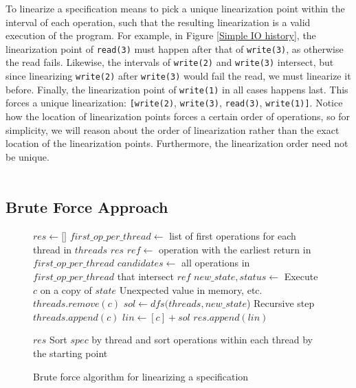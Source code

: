\documentclass[oneside, a4paper, onecolumn, 10pt]{article}
\begin{document}
To linearize a specification means to pick a unique linearization point within the interval of each operation, such that the resulting linearization is a valid execution of the program. For example, in Figure \ref{Simple IO history}, the linearization point of \verb|read(3)| must happen after that of \verb|write(3)|, as otherwise the read fails. Likewise, the intervals of \verb|write(2)| and \verb|write(3)| intersect, but since linearizing \verb|write(2)| after \verb|write(3)| would fail the read, we must linearize it before. Finally, the linearization point of \verb|write(1)| in all cases happens last. This forces a unique linearization: \verb|[write(2)|, \verb|write(3)|, \verb|read(3)|, \verb|write(1)]|. Notice how the location of linearization points forces a certain order of operations, so for simplicity, we will reason about the order of linearization rather than the exact location of the linearization points. Furthermore, the linearization order need not be unique.\\\\
\subsection{Brute Force Approach}
\begin{figure}
  \begin{algorithmic}[1]
    \State $res \gets \texttt{[]}$
    \State $first\_op\_per\_thread \gets$ list of first operations for each thread in $threads$
    \State \Return $res$
    \EndIf
    \State
    \State $ref \gets$ operation with the earliest return in $first\_op\_per\_thread$
    \State $candidates \gets$ all operations in $first\_op\_per\_thread$ that intersect $ref$
    \State $new\_state, status \gets$ Execute $c$ on a copy of $state$
     \hfill \Comment Unexpected value in memory, etc.
    \Continue
    \EndIf
    \State $threads.remove(c)$
    \State $sol \gets dfs(threads, new\_state$) \hfill
    \Comment Recursive step
    \State $threads.append(c)$
    \State $lin \gets [c] + sol$
    \State $res.append(lin)$

    \EndFor
    \State \Return $res$
    \EndFunction
    \State
    \State Sort $spec$ by thread and sort operations within each thread by the starting point
    \State \Return {}
    \EndFunction

  \end{algorithmic}
  \caption{\label{Brute Force Algorithm} Brute force algorithm for linearizing a specification}
\end{figure}
\noindent
\end{document}
